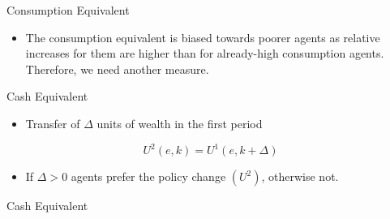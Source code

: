 \documentclass{beamer}
\begin{document}
\begin{frame}{Consumption Equivalent}
  \begin{itemize}
  
  \item {
  The consumption equivalent is biased towards poorer agents as relative increases for them are higher than for already-high consumption agents. Therefore, we need another measure.
  }
  \end{itemize}
\end{frame}

\begin{frame}{Cash Equivalent}
  \begin{itemize}
  \item {
  Transfer of $\Delta$ units of wealth in the first period
  }
  \end{itemize}
  
  \begin{equation}
  U^{2}(e,k) = U^{1}(e,k+\Delta) \nonumber
  \end{equation}
  
  \begin{itemize}
  \item {
  If $ \Delta>0 $ agents prefer the policy change $ (U^{2}) $, otherwise not.
  }
  \end{itemize}
\end{frame}

\begin{frame}{Cash Equivalent}
\end{frame}
\end{document}

